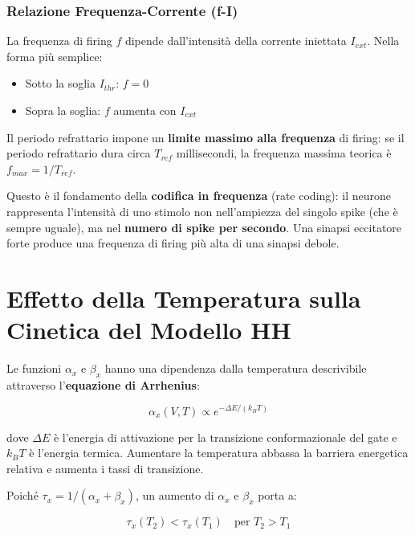 \subsubsection{Relazione Frequenza-Corrente (f-I)}

La frequenza di firing $f$ dipende dall'intensità della corrente iniettata $I_{ext}$. Nella forma più semplice:
\begin{itemize}
    \item Sotto la soglia $I_{thr}$: $f = 0$
    \item Sopra la soglia: $f$ aumenta con $I_{ext}$
\end{itemize}

\noindent Il periodo refrattario impone un \textbf{limite massimo alla frequenza} di firing: se il periodo refrattario dura circa $T_{ref}$ millisecondi, la frequenza massima teorica è $f_{max} = 1/T_{ref}$.

\begin{tcolorbox}[colback=gray!5, colframe=gray!40, arc=2mm, boxrule=0.5pt]
 Questo è il fondamento della \textbf{codifica in frequenza} (rate coding): il neurone rappresenta l'intensità di uno stimolo non nell'ampiezza del singolo spike (che è sempre uguale), ma nel \textbf{numero di spike per secondo}. Una sinapsi eccitatore forte produce una frequenza di firing più alta di una sinapsi debole.
\end{tcolorbox}


\section{Effetto della Temperatura sulla Cinetica del Modello HH}


 Le funzioni $\alpha_x$ e $\beta_x$ hanno una dipendenza dalla temperatura descrivibile attraverso l'\textbf{equazione di Arrhenius}:

\begin{equation}
\alpha_x(V, T) \propto e^{-\Delta E / (k_B T)}
\end{equation}

dove $\Delta E$ è l'energia di attivazione per la transizione conformazionale del gate e $k_B T$ è l'energia termica. Aumentare la temperatura abbassa la barriera energetica relativa e aumenta i tassi di transizione.


Poiché $\tau_x = 1/(\alpha_x + \beta_x)$, un aumento di $\alpha_x$ e $\beta_x$ porta a:

\begin{equation}
\tau_x(T_2) < \tau_x(T_1) \quad \text{per } T_2 > T_1
\end{equation}

